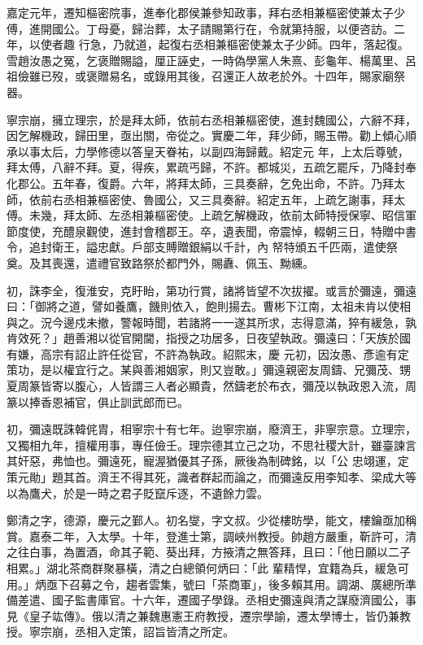 \begin{pinyinscope}
 嘉定元年，遷知樞密院事，進奉化郡侯兼參知政事，拜右丞相兼樞密使兼太子少傅，進開國公。丁母憂，歸治葬，太子請賜第行在，令就第持服，以便咨訪。二年，以使者趣
 行急，乃就道，起復右丞相兼樞密使兼太子少師。四年，落起復。雪趙汝愚之冤，乞褒贈賜謚，厘正誣史，一時偽學黨人朱熹、彭龜年、楊萬里、呂祖儉雖已歿，或褒贈易名，或錄用其後，召還正人故老於外。十四年，賜家廟祭器。



 寧宗崩，擁立理宗，於是拜太師，依前右丞相兼樞密使，進封魏國公，六辭不拜，因乞解機政，歸田里，亟出關，帝從之。實慶二年，拜少師，賜玉帶。勸上傾心順承以事太后，力學修德以答皇天眷祐，以副四海歸戴。紹定元
 年，上太后尊號，拜太傅，八辭不拜。夏，得疾，累疏丐歸，不許。都城災，五疏乞罷斥，乃降封奉化郡公。五年春，復爵。六年，將拜太師，三具奏辭，乞免出命，不許。乃拜太師，依前右丞相兼樞密使、魯國公，又三具奏辭。紹定五年，上疏乞謝事，拜太傅。未幾，拜太師、左丞相兼樞密使。上疏乞解機政，依前太師特授保寧、昭信軍節度使，充醴泉觀使，進封會稽郡王。卒，遺表聞，帝震悼，輟朝三日，特贈中書令，追封衛王，謚忠獻。戶部支賻贈銀絹以千計，內
 帑特頒五千匹兩，遣使祭奠。及其喪還，遣禮官致路祭於都門外，賜纛、佩玉、黝纁。



 初，誅李全，復淮安，克盱眙，第功行賞，諸將皆望不次拔擢。或言於彌遠，彌遠曰：「御將之道，譬如養鷹，饑則依入，飽則揚去。曹彬下江南，太祖未肯以使相與之。況今邊戍未撤，警報時聞，若諸將一一遂其所求，志得意滿，猝有緩急，孰肯效死？」趙善湘以從官開閫，指授之功居多，日夜望執政。彌遠曰：「天族於國有嫌，高宗有詔止許任從官，不許為執政。紹熙末，慶
 元初，因汝愚、彥逾有定策功，是以權宜行之。某與善湘姻家，則又豈敢。」彌遠親密友周鑄、兄彌茂、甥夏周篆皆寄以腹心，人皆謂三人者必顯貴，然鑄老於布衣，彌茂以執政恩入流，周篆以捧香恩補官，俱止訓武郎而已。



 初，彌遠既誅韓侂胄，相寧宗十有七年。迨寧宗崩，廢濟王，非寧宗意。立理宗，又獨相九年，擅權用事，專任儉壬。理宗德其立己之功，不思社稷大計，雖臺諫言其奸惡，弗恤也。彌遠死，寵渥猶優其子孫，厥後為制碑銘，以「公
 忠翊運，定策元勛」題其首。濟王不得其死，識者群起而論之，而彌遠反用李知孝、梁成大等以為鷹犬，於是一時之君子貶竄斥逐，不遺餘力雲。



 鄭清之字，德源，慶元之鄞人。初名燮，字文叔。少從樓昉學，能文，樓鑰亟加稱賞。嘉泰二年，入太學。十年，登進士第，調峽州教授。帥趙方嚴重，靳許可，清之往白事，為置酒，命其子範、葵出拜，方掖清之無答拜，且曰：「他日願以二子相累。」湖北茶商群聚暴橫，清之白總領何炳曰：「此
 輩精悍，宜籍為兵，緩急可用。」炳亟下召募之令，趨者雲集，號曰「茶商軍」，後多賴其用。調湖、廣總所準備差遣、國子監書庫官。十六年，遷國子學錄。丞相史彌遠與清之謀廢濟國公，事見《皇子竑傳》。俄以清之兼魏惠憲王府教授，遷宗學諭，遷太學博士，皆仍兼教授。寧宗崩，丞相入定策，詔旨皆清之所定。




\end{pinyinscope}
